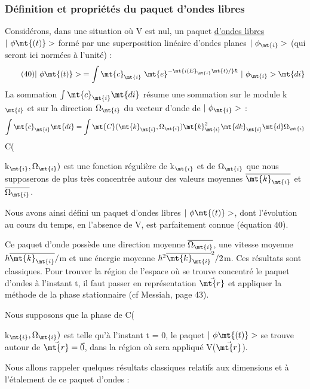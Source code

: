 \subsubsection{Définition et propriétés du paquet d'ondes libres}%
Considérons, dans une situation où V est nul, un paquet \ul{d'ondes
libres} $|\ \phi\mt{(t)}>$ formé par une superposition linéaire d'ondes planes $|\ \phi_\mt{i}>$
(qui seront ici normées à l'unité) :
\[
\tag{40}|\ \phi\mt{(t)}>\;=\int\mt{c}_\mt{i}\ \mt{e}^{-\mt{i(E}_\mt{i}\mt{t)/}\hbar}\ |\ \phi_\mt{i}>\mt{di}
\]
La sommation $\int\mt{c}_\mt{i}\mt{ di}$ résume une sommation sur le module k$_\mt{i}$ et sur la
direction $\Omega_\mt{i}$ du vecteur d'onde de $|\ \phi_\mt{i}>$ :
\[
\int\mt{c}_\mt{i}\mt{ di}=\int\mt{C}(\mt{k}_\mt{i},\Omega_\mt{i})\mt{ k}_\mt{i}^2\mt{ dk}_\mt{i}\mt{ d}\Omega_\mt{i}
\]
C({k$_\mt{i},\Omega_\mt{i})$ est une fonction régulière de k$_\mt{i}$ et de $\Omega_\mt{i}$ que nous supposerons
de plus très concentrée autour des valeurs moyennes $\overline{\mt{k}_\mt{i}}$ et $\overline{\Omega_\mt{i}}$.


Nous avons ainsi défini un paquet d'ondes libres $|\ \phi\mt{(t)}>$,
dont l'évolution au cours du temps, en l'absence de V, est parfaitement
connue (équation 40).

Ce paquet d'onde possède une direction moyenne $\overline{\Omega_\mt{i}}$, une vitesse moyenne $\hbar\overline{\mt{k}_\mt{i}}/$m et une
énergie moyenne $\hbar^2\overline{\mt{k}_\mt{i}}^2/2$m. Ces résultats sont classiques.
Pour trouver la région de l'espace
où se trouve concentré le paquet d'ondes à l'instant t, il faut passer en
représentation $\vec{\mt{r}}$ et appliquer
la méthode de la phase stationnaire (cf Messiah, page 43).

Nous supposons que la phase de C({k$_\mt{i},\Omega_\mt{i})$ est telle qu'à
l'instant t = 0, le paquet $|\ \phi\mt{(t)}>$ se trouve autour de $\vec{\mt{r}} = \vec{0}$, dans la
région où sera appliqué V($\vec{\mt{r}}$).

Nous allons rappeler quelques résultats classiques relatifs
aux dimensions et à l'étalement de ce paquet d'ondes :

}}
